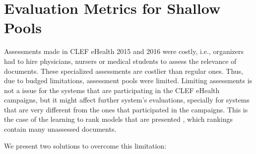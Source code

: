 
\section{Evaluation Metrics for Shallow Pools}
\label{sec:shallow}

Assessments made in CLEF eHealth 2015 and 2016 were costly, i.e., organizers had to hire physicians, nursers or medical students to assess the relevance of documents. These specialized assessments are costlier than regular ones. Thus, due to budged limitations, assessment pools were limited. 
Limiting assessments is not a issue for the systems that are participating in the CLEF eHealth campaigns, but it might affect further system's evaluations, specially for systems that are very different from the ones that participated in the campaigns.
This is the case of the learning to rank models that are presented , which rankings contain many unassessed documents. 

We present two solutions to overcome this limitation: 

